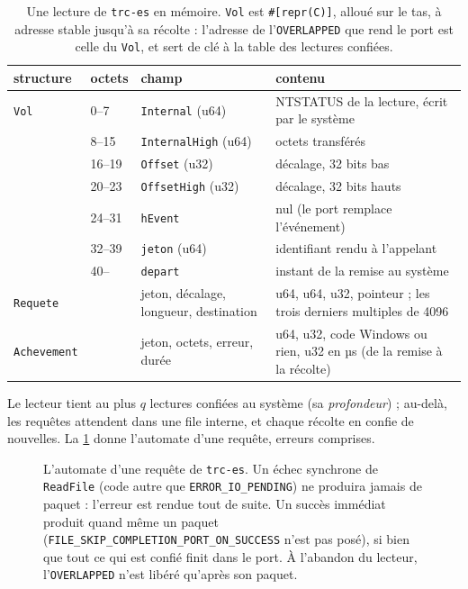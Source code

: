 \begin{table}[ht]
\centering\small
\caption[Une lecture de \texttt{trc-es} en mémoire]{Une lecture de \texttt{trc-es} en mémoire. \texttt{Vol} est \texttt{\#[repr(C)]}, alloué sur le tas, à adresse stable jusqu'à sa récolte : l'adresse de l'\texttt{OVERLAPPED} que rend le port est celle du \texttt{Vol}, et sert de clé à la table des lectures confiées.}
\label{tab:t2c-vol}
\begin{tabularx}{\linewidth}{@{}llp{3.2cm}X@{}}
\toprule
structure & octets & champ & contenu \\
\midrule
\texttt{Vol} & 0--7 & \texttt{Internal} (u64) & NTSTATUS de la lecture, écrit par le système \\
 & 8--15 & \texttt{InternalHigh} (u64) & octets transférés \\
 & 16--19 & \texttt{Offset} (u32) & décalage, 32 bits bas \\
 & 20--23 & \texttt{OffsetHigh} (u32) & décalage, 32 bits hauts \\
 & 24--31 & \texttt{hEvent} & nul (le port remplace l'événement) \\
 & 32--39 & \texttt{jeton} (u64) & identifiant rendu à l'appelant \\
 & 40-- & \texttt{depart} & instant de la remise au système \\
\midrule
\texttt{Requete} & & jeton, décalage, longueur, destination & u64, u64, u32, pointeur ; les trois derniers multiples de \num{4096} \\
\texttt{Achevement} & & jeton, octets, erreur, durée & u64, u32, code Windows ou rien, u32 en µs (de la remise à la récolte) \\
\bottomrule
\end{tabularx}
\end{table}

Le lecteur tient au plus $q$ lectures confiées au système (sa \emph{profondeur}) ; au-delà, les requêtes attendent dans une file interne, et chaque récolte en confie de nouvelles. La \cref{fig:t2c-automate} donne l'automate d'une requête, erreurs comprises.

\begin{figure}[ht]
\centering
\SchemaChmAutomate
\caption[L'automate d'une requête de \texttt{trc-es}]{L'automate d'une requête de \texttt{trc-es}. Un échec synchrone de \texttt{ReadFile} (code autre que \texttt{ERROR\_IO\_PENDING}) ne produira jamais de paquet : l'erreur est rendue tout de suite. Un succès immédiat produit quand même un paquet (\texttt{FILE\_SKIP\_\allowbreak COMPLETION\_\allowbreak PORT\_\allowbreak ON\_\allowbreak SUCCESS} n'est pas posé), si bien que tout ce qui est confié finit dans le port. À l'abandon du lecteur, l'\texttt{OVERLAPPED} n'est libéré qu'après son paquet.}
\label{fig:t2c-automate}
\end{figure}

